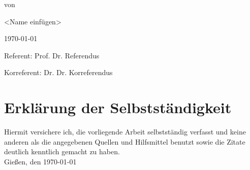 \begin{titlepage}
\begin{center}
von
\par\end{center}

\begin{center}
<Name einfügen>
\par\end{center}

\begin{center}
\today
\par\end{center}

\vspace{1.5cm}


Referent: Prof. Dr. Referendus

Korreferent: Dr. Dr. Korreferendus

\end{titlepage}


\thispagestyle{empty}
\chapter*{Erklärung der Selbstständigkeit}
\thispagestyle{empty}
Hiermit versichere ich, die vorliegende Arbeit selbstständig verfasst und keine anderen als die angegebenen Quellen und Hilfsmittel benutzt sowie die Zitate deutlich kenntlich gemacht zu haben.
\vspace{4\baselineskip}\\
Gießen, den \today {}
\vspace{4\baselineskip}\\
\clearpage
\mbox{}\thispagestyle{empty}

